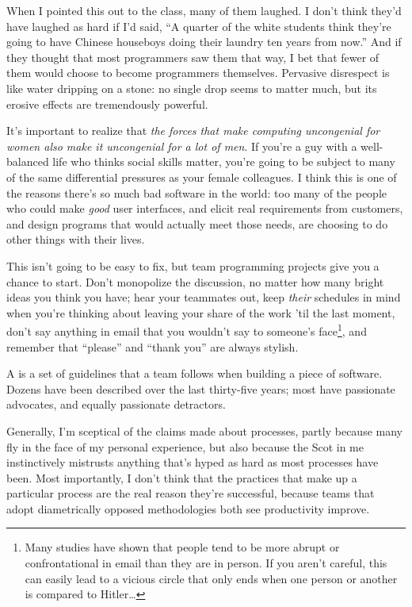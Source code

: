 \documentclass{report}
\begin{document}
When I pointed this out to the class, many of them laughed.  I don't
think they'd have laughed as hard if I'd said, ``A quarter of the
white students think they're going to have Chinese houseboys doing
their laundry ten years from now.''  And if they thought that most
programmers saw them that way, I bet that fewer of them would choose
to become programmers themselves.  Pervasive disrespect is like water
dripping on a stone: no single drop seems to matter much, but its
erosive effects are tremendously powerful.

It's important to realize that \emph{the forces that make computing
uncongenial for women also make it uncongenial for a lot of men}. If
you're a guy with a well-balanced life who thinks social skills
matter, you're going to be subject to many of the same differential
pressures as your female colleagues.  I think this is one of the
reasons there's so much bad software in the world: too many of the
people who could make \emph{good} user interfaces, and elicit real
requirements from customers, and design programs that would actually
meet those needs, are choosing to do other things with their lives.

This isn't going to be easy to fix, but team programming projects give
you a chance to start.  Don't monopolize the discussion, no matter how
many bright ideas you think you have; hear your teammates out, keep
\emph{their} schedules in mind when you're thinking about leaving your
share of the work 'til the last moment, don't say anything in email
that you wouldn't say to someone's face\footnote{Many studies have
shown that people tend to be more abrupt or confrontational in email
than they are in person.  If you aren't careful, this can easily lead
to a vicious circle that only ends when one person or another is
compared to Hitler{\ldots}}, and remember that ``please'' and ``thank
you'' are always stylish.


A  is a set of guidelines that a team
follows when building a piece of software.  Dozens have been described
over the last thirty-five years; most have passionate advocates, and
equally passionate detractors.

Generally, I'm sceptical of the claims made about processes, partly
because many fly in the face of my personal experience, but also
because the Scot in me instinctively mistrusts anything that's hyped
as hard as most processes have been.  Most importantly, I don't think
that the practices that make up a particular process are the real
reason they're successful, because teams that adopt diametrically
opposed methodologies both see productivity improve.
\end{document}
